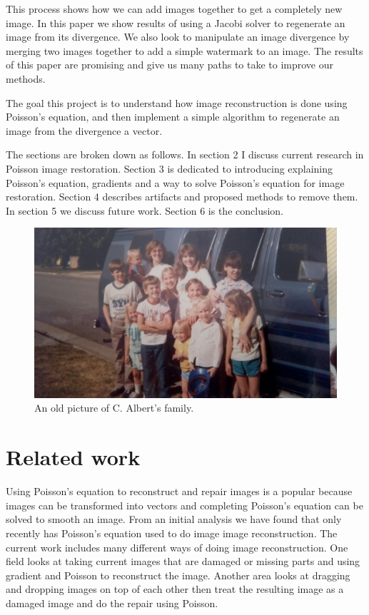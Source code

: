 \documentclass[10pt,twopage]{acmsiggraph}
\begin{document}
This process shows how we can add images together to get a completely new image. In this paper we show results of using a Jacobi solver to regenerate an image from its divergence. We also look to manipulate an image divergence by merging two images together to add a simple watermark to an image. The results of this paper are promising and give us many paths to take to improve our methods.

The goal this project is to understand how image reconstruction is done using Poisson's equation, and then implement a simple algorithm to regenerate an image from the divergence a vector. 

The sections are broken down as follows. In section 2 I discuss current research in Poisson image restoration. Section 3 is dedicated to introducing explaining Poisson's equation, gradients and a way to solve Poisson's equation for image restoration. Section 4 describes artifacts and proposed methods to remove them. In section 5 we discuss future work. Section 6 is the conclusion.
 
\begin{figure}
\centering
\includegraphics[width=.44\textwidth]{fig/family.jpg}
\caption{An old picture of C. Albert's family.}
\label{family}
\end{figure}

\section{Related work}

Using Poisson's equation to reconstruct and repair images is a popular because images can be transformed into vectors and completing Poisson's equation can be solved to smooth an image. From an initial analysis we have found that only recently \cite{Bertalmio} has Poisson's equation used to do image image reconstruction. The current work includes many different ways of doing image reconstruction. One field looks at taking current images that are damaged or missing parts and using gradient and Poisson to reconstruct the image. Another area looks at dragging and dropping images on top of each other then treat the resulting image as a damaged image and do the repair using Poisson.
\end{document}
